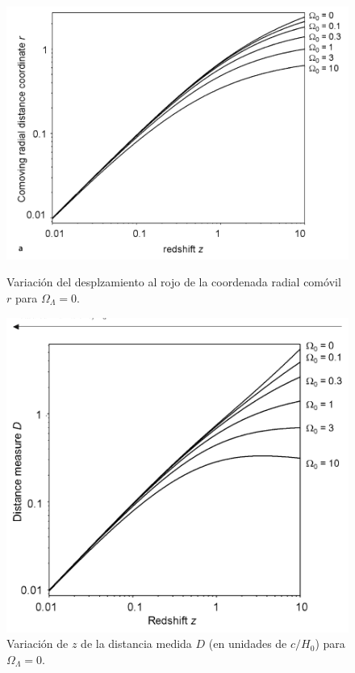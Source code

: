 \documentclass[11pt]{article}
\begin{document}
\begin{figure}[H]
        \begin{minipage}[b]{0.5\linewidth}
        \centering
        \includegraphics[scale=0.42]{redshift_r7a.png}
        \caption{\footnotesize{Variación del desplzamiento al rojo de la coordenada radial comóvil $r$ para $\Omega_{\Lambda}=0$.}}
    \end{minipage}
        \hspace{0.5cm}
    \begin{minipage}[b]{0.4\linewidth}
        \centering
        \includegraphics[scale=0.4]{redshift_r77.png}
        \caption{\footnotesize{Variación de $z$ de la distancia medida $D$ (en unidades de $c/H_0$) para $\Omega_{\Lambda}=0$. }}
    \end{minipage}
\end{figure}
\end{document}
